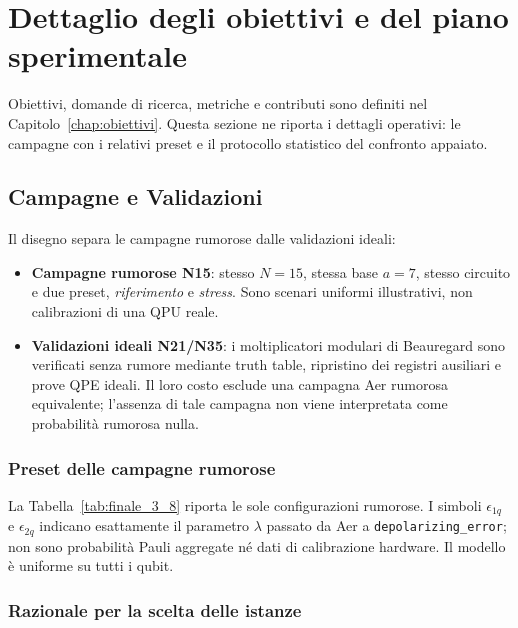 \section{Dettaglio degli obiettivi e del piano sperimentale}
\label{app:obiettivi}
\begin{onehalfspace}

Obiettivi, domande di ricerca, metriche e contributi sono definiti nel Capitolo~\ref{chap:obiettivi}. Questa sezione ne riporta i dettagli operativi: le campagne con i relativi preset e il protocollo statistico del confronto appaiato.

\subsection{Campagne e Validazioni}
\label{app:obiettivi:usecase}

Il disegno separa le campagne rumorose dalle validazioni ideali:

\begin{itemize}
    \item \textbf{Campagne rumorose N15}: stesso $N=15$, stessa base $a=7$, stesso circuito e due preset, \emph{riferimento} e \emph{stress}. Sono scenari uniformi illustrativi, non calibrazioni di una \ac{QPU} reale.
    \item \textbf{Validazioni ideali N21/N35}: i moltiplicatori modulari di Beauregard sono verificati senza rumore mediante truth table, ripristino dei registri ausiliari e prove QPE ideali. Il loro costo esclude una campagna Aer rumorosa equivalente; l'assenza di tale campagna non viene interpretata come probabilità rumorosa nulla.
\end{itemize}

\subsubsection{Preset delle campagne rumorose}

La Tabella~\ref{tab:finale_3_8} riporta le sole configurazioni rumorose. I simboli $\epsilon_{1q}$ e $\epsilon_{2q}$ indicano esattamente il parametro $\lambda$ passato da Aer a \texttt{depolarizing\_error}; non sono probabilità Pauli aggregate né dati di calibrazione hardware. Il modello è uniforme su tutti i qubit.


\subsubsection{Razionale per la scelta delle istanze}
\label{subsec:razionale_istanze}


\end{onehalfspace}
